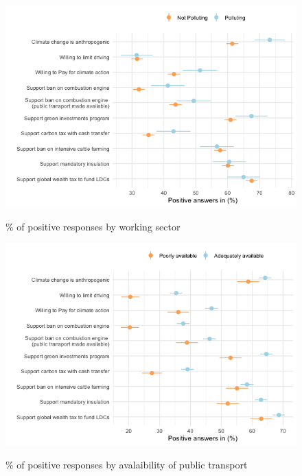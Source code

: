 \begin{framefont}{\small}
\begin{frame}{}%
\begin{figure}[h!]
\caption{\% of positive responses by working sector}
\includegraphics[width=.7\paperwidth]{../figures/FR/positive_all_by_polluting_sector_FR.png} \\
\end{figure}
\end{frame}

\begin{frame}{}%
\begin{figure}[h!]
\caption{\% of positive responses by avalaibility of public transport}
\includegraphics[width=.7\paperwidth]{../figures/FR/positive_all_by_availability_transport_FR.png} \\
\end{figure}
\end{frame}


\end{framefont}

